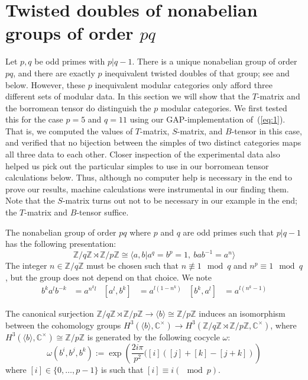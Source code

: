 \documentclass[11pt]{book}
\theoremstyle{Rem}
\theoremstyle{definition}
\numberwithin{equation}{section}
\newcommand\CC{\mathbb C}
\newcommand\ZZ{\mathbb Z}
\newcommand\CCu{\CC^\times}
\newcommand\semdir{\rtimes}
\begin{document}
\section{Twisted doubles of nonabelian groups of order $pq$}\label{sec:Example}
Let $p,q$ be odd primes with $p|q-1$. There is a unique nonabelian group of order $pq$, and there are exactly $p$ inequivalent twisted doubles of that group; see \cite{2017arXiv170802796M} and below. However, these $p$ inequivalent modular categories only afford three different sets of modular data. In this section we will show that the $T$-matrix and the borromean tensor do distinguish the $p$ modular categories. We first tested this for the case $p=5$ and $q=11$ using our GAP-implementation of~(\cref{eq:1}). That is, we computed the values of $T$-matrix, $S$-matrix, and $B$-tensor in this case, and verified that no bijection between the simples of two distinct categories maps all three data to each other. Closer inspection of the experimental data also helped us pick out the particular simples to use in our borromean tensor calculations below. Thus, although no computer help is necessary in the end to prove our results, machine calculations were instrumental in  our finding them. Note that the $S$-matrix turns out not to be necessary in our example in the end; the $T$-matrix and $B$-tensor suffice.



The nonabelian group of order $pq$ where $p$ and $q$ are odd primes such that $p | q-1$ has the following presentation:
$$
\ZZ/q\ZZ \semdir \ZZ/p\ZZ \cong \langle a,b | a^q=b^p=1 ,\ bab^{-1}=a^n \rangle
$$
The integer $n \in \ZZ/q\ZZ$ must be chosen such that $n \not\equiv 1 \mod q$ and $n^p \equiv 1 \mod q$, but the group does not depend on that choice.
We note
\begin{align}\label{eq:pqformulas}
  b^k a^l b^{-k} &= a^{n^k l} &
  [a^l,b^k]&=a^{l(1-n^k)}&
  [b^k,a^l]&=a^{l(n^k-1)}
\end{align}


The canonical surjection $\ZZ/q\ZZ \semdir \ZZ/p\ZZ\to \langle b\rangle\cong\ZZ/p\ZZ$ induces an isomorphism between the cohomology groups $H^3(\langle b\rangle ,\CCu)\to H^3(\ZZ/q\ZZ \semdir \ZZ/p\ZZ,\CCu)$, where $H^3(\langle b\rangle ,\CCu)\cong \ZZ/p\ZZ$ is generated by the following cocycle $\omega$:
$$
\omega(b^i,b^j,b^k):=\exp\left( \frac{2i\pi}{p^2}([i]([j]+[k]-[j+k])\right)
$$
where $[i]\in\{0,\dots,p-1\}$ is such that $[i]\equiv i(\mod p)$.
\end{document}
